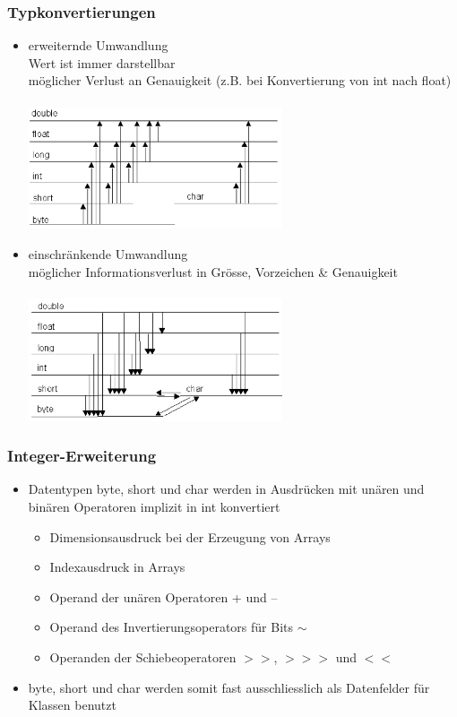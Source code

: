 \documentclass[a4paper,10pt]{article}
\begin{document}
\subsubsection{Typkonvertierungen}
\begin{itemize}
	\item erweiternde Umwandlung \\
		Wert ist immer darstellbar \\
		m\"oglicher Verlust an Genauigkeit (z.B. bei Konvertierung von int nach float) \\ \\
		\includegraphics[width=75mm]{erweiternde_typumwandlung.png} \\
		
	\item einschr\"ankende Umwandlung \\
		m\"oglicher Informationsverlust in Gr\"osse, Vorzeichen \& Genauigkeit \\ \\
		\includegraphics[width=75mm]{einschraenkende_typumwandlung.png}
\end{itemize}

\subsubsection{Integer-Erweiterung}
\begin{itemize}
	\item Datentypen byte, short und char werden in Ausdr\"ucken mit un\"aren und bin\"aren Operatoren implizit in int konvertiert
		\begin{itemize}
			\item Dimensionsausdruck bei der Erzeugung von Arrays
			\item Indexausdruck in Arrays
			\item Operand der un\"aren Operatoren + und –
			\item Operand des Invertierungsoperators f\"ur Bits $\sim$
			\item Operanden der Schiebeoperatoren $>>$, $>>>$ und $<<$
		\end{itemize}
	\item byte, short und char werden somit fast ausschliesslich als Datenfelder f\"ur Klassen benutzt
\end{itemize}
\end{document}
